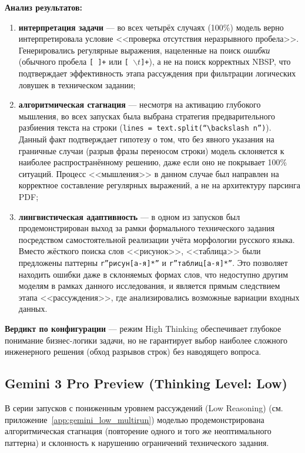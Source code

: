 \textbf{Анализ результатов:}
\begin{enumerate}
    \item \textbf{интерпретация задачи} --- во всех четырёх случаях (100\%) модель верно интерпретировала условие <<проверка отсутствия неразрывного пробела>>. Генерировались регулярные выражения, нацеленные на поиск \textit{ошибки} (обычного пробела \texttt{[ ]+} или \texttt{[ $\backslash t$]+}), а не на поиск корректных NBSP, что подтверждает эффективность этапа рассуждения при фильтрации логических ловушек в техническом задании;
    
    \item \textbf{алгоритмическая стагнация} --- несмотря на активацию глубокого мышления, во всех запусках была выбрана стратегия предварительного разбиения текста на строки (\texttt{lines = text.split(``$\backslash n$'')}). Данный факт подтверждает гипотезу о том, что без явного указания на граничные случаи (разрыв фразы переносом строки) модель склоняется к наиболее распространённому решению, даже если оно не покрывает 100\% ситуаций. Процесс <<мышления>> в данном случае был направлен на корректное составление регулярных выражений, а не на архитектуру парсинга PDF;
    
    \item \textbf{лингвистическая адаптивность} --- в одном из запусков был продемонстрирован выход за рамки формального технического задания посредством самостоятельной реализации учёта морфологии русского языка. Вместо жёсткого поиска слов <<рисунок>>, <<таблица>> были предложены паттерны \texttt{r''рисун[а-я]*''} и \texttt{r''таблиц[а-я]*''}. Это позволяет находить ошибки даже в склоняемых формах слов, что недоступно другим моделям в рамках данного исследования, и является прямым следствием этапа <<рассуждения>>, где анализировались возможные вариации входных данных.
\end{enumerate}

\textbf{Вердикт по конфигурации} --- режим High Thinking обеспечивает глубокое понимание бизнес-логики задачи, но не гарантирует выбор наиболее сложного инженерного решения (обход разрывов строк) без наводящего вопроса.

\subsection{Gemini 3 Pro Preview (Thinking Level: Low)}

В серии запусков с пониженным уровнем рассуждений (Low Reasoning) (см. приложение~\ref{app:gemini_low_multirun}) моделью продемонстрирована алгоритмическая стагнация (повторение одного и того же неоптимального паттерна) и склонность к нарушению ограничений технического задания.

